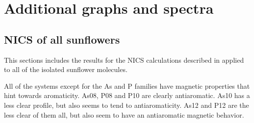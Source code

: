 \chapter{Additional graphs and spectra}

\newpage
\section{NICS of all sunflowers}
This sections includes the results for the NICS calculations described in  applied to all of the isolated sunflower molecules.

All of the systems except for the As and P families have magnetic properties that hint towards aromaticity.
As08, P08 and P10 are clearly antiaromatic.
As10 has a less clear profile, but also seems to tend to antiaromaticity.
As12 and P12 are the less clear of them all, but also seem to have an antiaromatic magnetic behavior.

